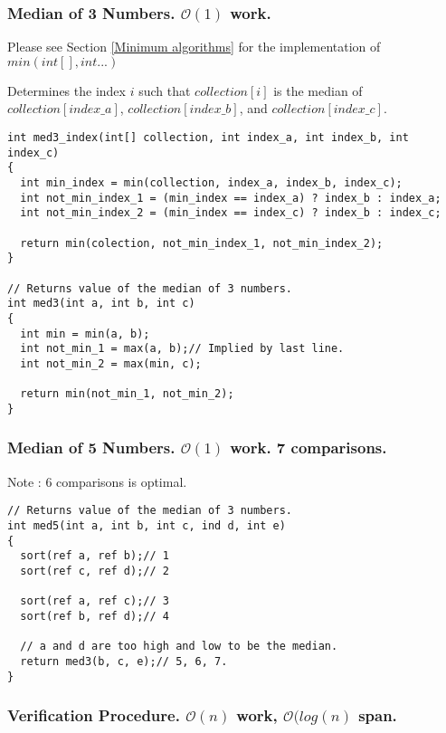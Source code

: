 \documentclass[12pt, letterpaper]{book}
\newcommand{\bigO}{\mathcal{O}}
\begin{document}
\subsubsection{Median of 3 Numbers. $\bigO(1)$ work.}

Please see Section \ref{Minimum algorithms} for the implementation of $min(int[], int...)$

Determines the index $i$ such that $collection[i]$ is the median of $collection[index\_a]$, $collection[index\_b]$, and $collection[index\_c]$.

\begin{verbatim}
int med3_index(int[] collection, int index_a, int index_b, int index_c)
{
  int min_index = min(collection, index_a, index_b, index_c);
  int not_min_index_1 = (min_index == index_a) ? index_b : index_a;
  int not_min_index_2 = (min_index == index_c) ? index_b : index_c;

  return min(colection, not_min_index_1, not_min_index_2);
}

// Returns value of the median of 3 numbers.
int med3(int a, int b, int c)
{
  int min = min(a, b);
  int not_min_1 = max(a, b);// Implied by last line.
  int not_min_2 = max(min, c);

  return min(not_min_1, not_min_2);
}
\end{verbatim}


\subsubsection{Median of 5 Numbers. $\bigO(1)$ work. 7 comparisons.}

Note : 6 comparisons is optimal.

\begin{verbatim}
// Returns value of the median of 3 numbers.
int med5(int a, int b, int c, ind d, int e)
{
  sort(ref a, ref b);// 1
  sort(ref c, ref d);// 2

  sort(ref a, ref c);// 3
  sort(ref b, ref d);// 4

  // a and d are too high and low to be the median.
  return med3(b, c, e);// 5, 6, 7.  
}
\end{verbatim}


\newpage

		\subsubsection{Verification Procedure. $\bigO(n)$ work, $\bigO(log(n)$ span.}
\end{document}
